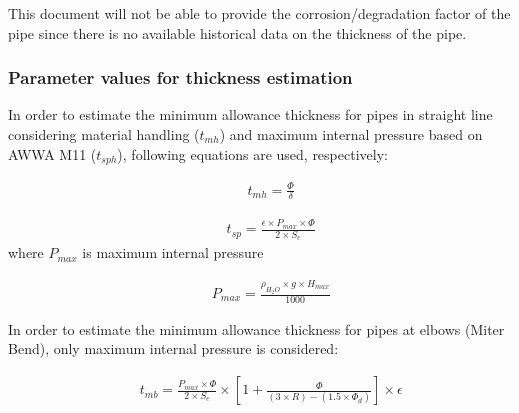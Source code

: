 This document will not be able to provide the corrosion/degradation factor of the pipe since there is no available historical data on the thickness of the pipe.

\subsubsection{Parameter values for thickness estimation}
In order to estimate the minimum allowance thickness for pipes in straight line considering material handling ($t_{mh}$) and maximum internal pressure based on AWWA M11 ($t_{sph}$), following equations are used, respectively:

\begin{eqnarray}
&& t_{mh} = \frac{\Phi}{\delta} \label{ch05thickness01}
\end{eqnarray}

\begin{eqnarray}
&& t_{sp} = \frac{\epsilon\times P_{max} \times \Phi}{2 \times S_e} \label{ch05thickness02}
\end{eqnarray}
where $P_{max}$ is maximum internal pressure

\begin{eqnarray}
&& P_{max} = \frac{\rho_{H_2O} \times g \times H_{max}}{1000} \label{ch05thickness03}
\end{eqnarray}

In order to estimate the minimum allowance thickness for pipes at elbows (Miter Bend), only maximum internal pressure is considered:

\begin{eqnarray}
&& t_{mb} = \frac{P_{max} \times \Phi}{2 \times S_e} \times \left[ 1 + \frac{\Phi}{(3 \times R)-(1.5 \times \Phi_d)}\right]\times \epsilon \label{ch05thickness04}
\end{eqnarray}



